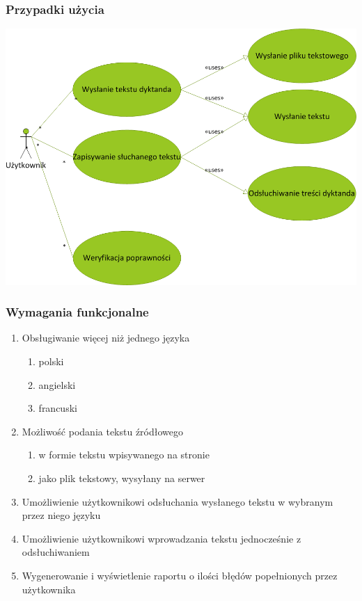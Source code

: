 \subsubsection {Przypadki użycia} 
\includegraphics[scale=0.55]{useCaseDictando.png} 
\subsubsection{Wymagania funkcjonalne}
\begin{enumerate}
	\item Obsługiwanie więcej niż jednego języka
		\begin{enumerate}
			\item polski
			\item angielski
			\item francuski
		\end{enumerate}
	\item Możliwość podania tekstu źródłowego
		\begin{enumerate}
			\item w formie tekstu wpisywanego na stronie
			\item jako plik tekstowy, wysyłany na serwer
		\end{enumerate}
	\item Umożliwienie użytkownikowi odsłuchania wysłanego tekstu w wybranym przez niego języku
	\item Umożliwienie użytkownikowi wprowadzania tekstu jednocześnie z odsłuchiwaniem
	\item Wygenerowanie i wyświetlenie raportu o ilości błędów popełnionych przez użytkownika
\end{enumerate}
